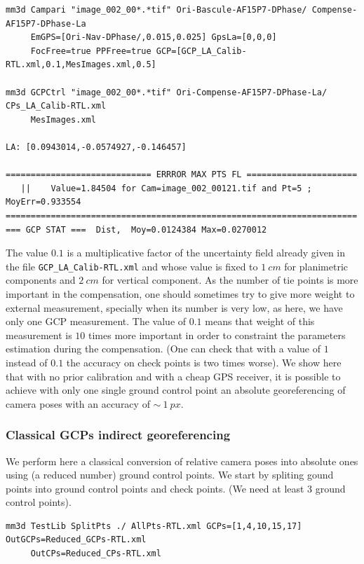 \begin{verbatim}
mm3d Campari "image_002_00*.*tif" Ori-Bascule-AF15P7-DPhase/ Compense-AF15P7-DPhase-La 
     EmGPS=[Ori-Nav-DPhase/,0.015,0.025] GpsLa=[0,0,0] 
     FocFree=true PPFree=true GCP=[GCP_LA_Calib-RTL.xml,0.1,MesImages.xml,0.5]
     
mm3d GCPCtrl "image_002_00*.*tif" Ori-Compense-AF15P7-DPhase-La/ CPs_LA_Calib-RTL.xml
     MesImages.xml

LA: [0.0943014,-0.0574927,-0.146457]

============================= ERRROR MAX PTS FL ======================
   ||    Value=1.84504 for Cam=image_002_00121.tif and Pt=5 ; MoyErr=0.933554
======================================================================
=== GCP STAT ===  Dist,  Moy=0.0124384 Max=0.0270012
\end{verbatim}


The value $0.1$ is a multiplicative factor of the uncertainty field already given in the file {\tt GCP\_LA\_Calib-RTL.xml} and whose value is fixed to $1\ cm$ for planimetric components and $2\ cm$ for vertical component. 
As the number of tie points is more important in the compensation, one should sometimes try to give more weight to external measurement, specially when its number is very low, as here, we have only one GCP measurement. 
The value of $0.1$ means that weight of this measurement is $10$ times more important in order to constraint the parameters estimation during the compensation. 
(One can check that with a value of $1$ instead of $0.1$ the accuracy on check points is two times worse).
We show here that with no prior calibration and with a cheap GPS receiver, it is possible to achieve with only one single ground control point an absolute georeferencing of camera poses with an accuracy of $\sim\ 1\ px$.
\subsubsection{Classical GCPs indirect georeferencing}
We perform here a classical conversion of relative camera poses into absolute ones using (a reduced number) ground control points. 
We start by spliting gound points into ground control points and check points. (We need at least 3 ground control points).

\begin{verbatim}
mm3d TestLib SplitPts ./ AllPts-RTL.xml GCPs=[1,4,10,15,17] OutGCPs=Reduced_GCPs-RTL.xml 
     OutCPs=Reduced_CPs-RTL.xml
\end{verbatim}

